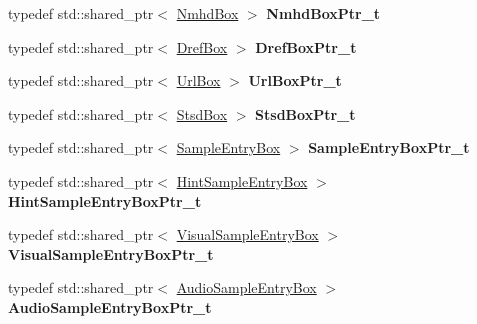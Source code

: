 \begin{DoxyCompactItemize}
\item 
\mbox{\label{namespacemp4_parser_a21a08ffce63e0e9c39e7506a0bcd07a1}} 
typedef std\+::shared\+\_\+ptr$<$ \mbox{\hyperlink{classmp4_parser_1_1_nmhd_box}{Nmhd\+Box}} $>$ {\bfseries Nmhd\+Box\+Ptr\+\_\+t}
\item 
\mbox{\label{namespacemp4_parser_afb25f8c19681ce3e1b96dc9549af8603}} 
typedef std\+::shared\+\_\+ptr$<$ \mbox{\hyperlink{classmp4_parser_1_1_dref_box}{Dref\+Box}} $>$ {\bfseries Dref\+Box\+Ptr\+\_\+t}
\item 
\mbox{\label{namespacemp4_parser_ad83aa0192084d08f371068391a7588e1}} 
typedef std\+::shared\+\_\+ptr$<$ \mbox{\hyperlink{classmp4_parser_1_1_url_box}{Url\+Box}} $>$ {\bfseries Url\+Box\+Ptr\+\_\+t}
\item 
\mbox{\label{namespacemp4_parser_ad7847245732eca11d1c5541e59a980d6}} 
typedef std\+::shared\+\_\+ptr$<$ \mbox{\hyperlink{classmp4_parser_1_1_stsd_box}{Stsd\+Box}} $>$ {\bfseries Stsd\+Box\+Ptr\+\_\+t}
\item 
\mbox{\label{namespacemp4_parser_aa5f1b0108f1b71ef7fe51d2d34fbe911}} 
typedef std\+::shared\+\_\+ptr$<$ \mbox{\hyperlink{classmp4_parser_1_1_sample_entry_box}{Sample\+Entry\+Box}} $>$ {\bfseries Sample\+Entry\+Box\+Ptr\+\_\+t}
\item 
\mbox{\label{namespacemp4_parser_a451b7a67ac6ba2e7c9dca9ff3e20bcf9}} 
typedef std\+::shared\+\_\+ptr$<$ \mbox{\hyperlink{classmp4_parser_1_1_hint_sample_entry_box}{Hint\+Sample\+Entry\+Box}} $>$ {\bfseries Hint\+Sample\+Entry\+Box\+Ptr\+\_\+t}
\item 
\mbox{\label{namespacemp4_parser_acc41a5b4fcf5a95536f01d508e25ac5a}} 
typedef std\+::shared\+\_\+ptr$<$ \mbox{\hyperlink{classmp4_parser_1_1_visual_sample_entry_box}{Visual\+Sample\+Entry\+Box}} $>$ {\bfseries Visual\+Sample\+Entry\+Box\+Ptr\+\_\+t}
\item 
\mbox{\label{namespacemp4_parser_a936ba40aa1dd7cc9b2f2e9b747bf7e66}} 
typedef std\+::shared\+\_\+ptr$<$ \mbox{\hyperlink{classmp4_parser_1_1_audio_sample_entry_box}{Audio\+Sample\+Entry\+Box}} $>$ {\bfseries Audio\+Sample\+Entry\+Box\+Ptr\+\_\+t}

\end{DoxyCompactItemize}
